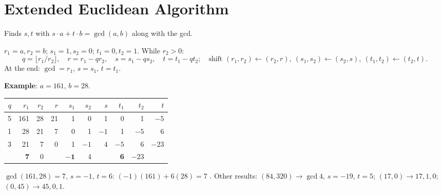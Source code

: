 \section{Extended Euclidean Algorithm}\label{sec:exteuclid}

Finds $s, t$ with $\boxed{s \cdot a + t \cdot b = \gcd(a, b)}$ along with the gcd.
\begin{keybox}[title=Algorithm (Forouzan table)]
$r_1 = a, r_2 = b$; \; $s_1 = 1, s_2 = 0$; \; $t_1 = 0, t_2 = 1$. While $r_2 > 0$:
\[
q = \lfloor r_1 / r_2 \rfloor,\quad r = r_1 - q r_2,\quad s = s_1 - q s_2,\quad t = t_1 - q t_2;\quad\text{shift } (r_1, r_2) \leftarrow (r_2, r),\ (s_1,s_2) \leftarrow (s_2,s),\ (t_1,t_2) \leftarrow (t_2,t).
\]
At the end: $\gcd = r_1$, \;$s = s_1$, \;$t = t_1$.
\end{keybox}

\textbf{Example}: $a = 161$, $b = 28$.
\begin{center}\small
\begin{tabular}{@{}r|rrr|rrr|rrr@{}}
\toprule
$q$ & $r_1$ & $r_2$ & $r$ & $s_1$ & $s_2$ & $s$ & $t_1$ & $t_2$ & $t$\\
\midrule
5 & 161 & 28 & 21 & 1 & 0 & 1 & 0 & 1 & $-5$\\
1 & 28 & 21 & 7 & 0 & 1 & $-1$ & 1 & $-5$ & 6\\
3 & 21 & 7 & 0 & 1 & $-1$ & 4 & $-5$ & 6 & $-23$\\
 & \textbf{7} & 0 & & $\mathbf{-1}$ & 4 & & \textbf{6} & $-23$ & \\
\bottomrule
\end{tabular}
\end{center}
$\gcd(161, 28) = 7$, $s = -1$, $t = 6$: \;$(-1)(161) + 6(28) = 7$ \checkmark. Other results: $(84, 320) \to \gcd 4$, $s = -19$, $t = 5$; \;$(17, 0) \to 17, 1, 0$; \;$(0, 45) \to 45, 0, 1$.

